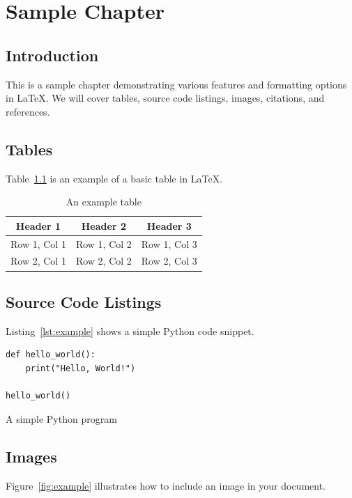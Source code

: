 \chapter{Sample Chapter}
\label{chap:sample}

\section{Introduction}
This is a sample chapter demonstrating various features and formatting options in \LaTeX. We will cover tables, source code listings, images, citations, and references.

\section{Tables}
Table~\ref{tab:example} is an example of a basic table in \LaTeX.

\begin{table}[h]
    \centering
    \begin{tabular}{|c|c|c|}
        \hline
        Header 1 & Header 2 & Header 3 \\
        \hline
        Row 1, Col 1 & Row 1, Col 2 & Row 1, Col 3 \\
        Row 2, Col 1 & Row 2, Col 2 & Row 2, Col 3 \\
        \hline
    \end{tabular}
    \caption{An example table}
    \label{tab:example}
\end{table}

\section{Source Code Listings}
Listing~\ref{lst:example} shows a simple Python code snippet.

\begin{listing}[H]
\begin{verbatim}
def hello_world():
    print("Hello, World!")

hello_world()
\end{verbatim}
\caption{A simple Python program}
\label{lst:example}
\end{listing}

\section{Images}
Figure~\ref{fig:example} illustrates how to include an image in your document.

